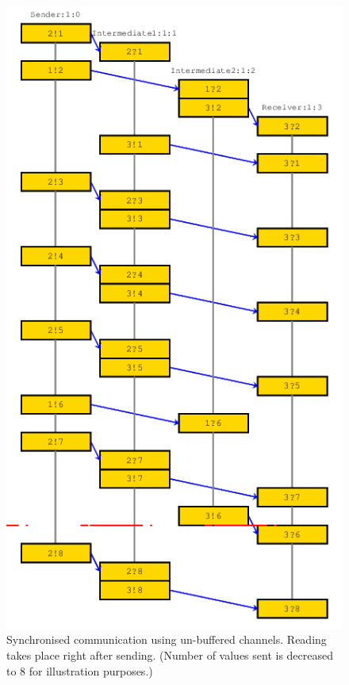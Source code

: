 \documentclass{report}
\begin{document}
\begin{itemize}
\begin{figure} [\textwidth]
\hspace{0cm}
\includegraphics[scale=0.6]{Images/sync.png}
\caption{Synchronised communication using un-buffered channels. Reading takes place right after sending. (Number of values sent is decreased to 8 for illustration purposes.)}
\end{figure}


\end{itemize}
\end{document}
